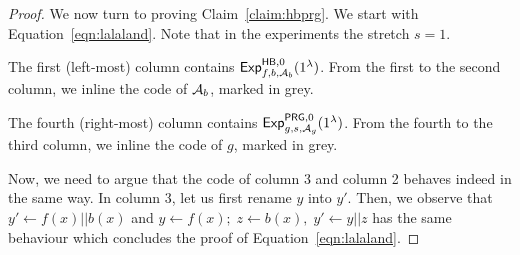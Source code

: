 \documentclass[a4paper,table,dvipsnames]{article}
\theoremstyle{definition}
\begin{document}
\begin{proof}
We now turn to proving Claim~\ref{claim:hbprg}. We start with Equation~\ref{eqn:lalaland}. 
Note that in the experiments the stretch $s=1$.

\begin{center}
\begin{pchstack}
		    \pchspace
	  		\pchspace
				\pchspace
\end{pchstack}
\end{center}
The first (left-most) column contains ${\mathsf{Exp}}_{f,b,\mathcal{A}_b}^{\mathsf{HB},0}(1^\lambda)$.
From the first to the second column, we inline the code of $\mathcal{A}_b$, marked in grey.

The fourth (right-most) column contains ${\mathsf{Exp}}_{g,s,\mathcal{A}_g}^{\mathsf{PRG},0}(1^\lambda)$.
From the fourth to the third column, we inline the code of $g$, marked in grey.

Now, we need to argue that the code of column 3 and column 2 behaves indeed in the same way.
In column 3, let us first rename $y$ into $y'$. Then, we observe that $y'\gets f(x)||b(x)$ and $y\gets f(x);\;z\gets b(x),\; y'\gets y||z$
has the same behaviour which concludes the proof of Equation~\ref{eqn:lalaland}.


\end{proof}
\end{document}
